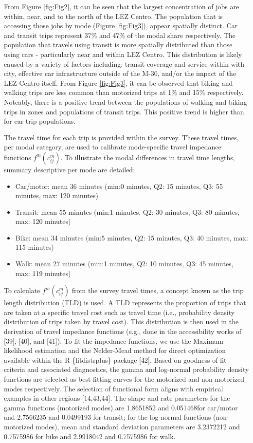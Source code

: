 \documentclass[10pt,letterpaper]{article}
\providecommand{\tightlist}{%
  \setlength{\itemsep}{0pt}\setlength{\parskip}{0pt}}
\begin{document}
From Figure \ref{fig:Fig2}, it can be seen that the largest
concentration of jobs are within, near, and to the north of the LEZ
Centro. The population that is accessing those jobs by mode (Figure
\ref{fig:Fig3}), appear spatially distinct. Car and transit trips
represent 37\% and 47\% of the modal share respectively. The population
that travels using transit is more spatially distributed than those
using cars - particularly near and within LEZ Centro. This distribution
is likely caused by a variety of factors including: transit coverage and
service within with city, effective car infrastructure outside of the
M-30, and/or the impact of the LEZ Centro itself. From Figure
\ref{fig:Fig3}, it can be observed that biking and walking trips are
less common than motorized trips at 1\% and 15\% respectively. Noteably,
there is a positive trend between the populations of walking and biking
trips in zones and populations of transit trips. This positive trend is
higher than for car trip populations.

The travel time for each trip is provided within the survey. These
travel times, per modal category, are used to calibrate mode-specific
travel impedance functions \(f^m(c_{ij}^m)\). To illustrate the modal
differences in travel time lengths, summary descriptive per mode are
detailed:

\begin{itemize}
\tightlist
\item
  Car/motor: mean 36 minutes (min:0 minutes, Q2: 15 minutes, Q3: 55
  minutes, max: 120 minutes)
\item
  Transit: mean 55 minutes (min:1 minutes, Q2: 30 minutes, Q3: 80
  minutes, max: 120 minutes)
\item
  Bike: mean 34 minutes (min:5 minutes, Q2: 15 minutes, Q3: 40 minutes,
  max: 115 minutes)
\item
  Walk: mean 27 minutes (min:1 minutes, Q2: 10 minutes, Q3: 45 minutes,
  max: 119 minutes)
\end{itemize}

To calculate \(f^m(c_{ij}^m)\) from the survey travel times, a concept
known as the trip length distribution (TLD) is used. A TLD represents
the proportion of trips that are taken at a specific travel cost such as
travel time (i.e., probability density distribution of trips taken by
travel cost). This distribution is then used in the derivation of travel
impedance functions (e.g., done in the accessibility works of {[}39{]},
{[}40{]}, and {[}41{]}). To fit the impedance functions, we use the
Maximum likelihood estimation and the Nelder-Mead method for direct
optimization available within the R \{fitdistrplus\} package {[}42{]}.
Based on goodness-of-fit criteria and associated diagnostics, the gamma
and log-normal probability density functions are selected as best
fitting curves for the motorized and non-motorized modes respectively.
The selection of functional form aligns with empirical examples in other
regions {[}14,43,44{]}. The shape and rate parameters for the gamma
functions (motorized modes) are 1.8651852 and 0.051468for car/motor and
2.7566235 and 0.0499193 for transit; for the log-normal functions
(non-motorized modes), mean and standard deviation parameters are
3.2372212 and 0.7575986 for bike and 2.9918042 and 0.7575986 for walk.
\end{document}
